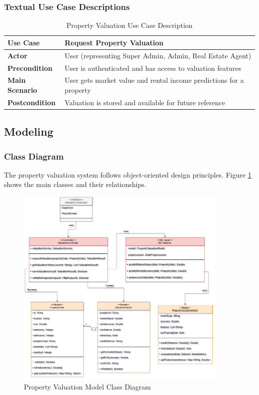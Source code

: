 \subsubsection{Textual Use Case Descriptions}

\begin{table}[htbp]
    \centering
    \begin{tabular}{|p{3cm}|p{10cm}|}
        \hline
        \textbf{Use Case} & \textbf{Request Property Valuation} \\
        \hline
        \textbf{Actor} & User (representing Super Admin, Admin, Real Estate Agent) \\
        \hline
        \textbf{Precondition} & User is authenticated and has access to valuation features \\
        \hline
        \textbf{Main Scenario} & User gets market value and rental income predictions for a property \\
        \hline
        \textbf{Postcondition} & Valuation is stored and available for future reference \\
        \hline
    \end{tabular}
    \caption{Property Valuation Use Case Description}
    \label{tab:property-valuation-use-case}
\end{table}

\subsection{Modeling}
\subsubsection{Class Diagram}
The property valuation system follows object-oriented design principles. Figure \ref{fig:valuation-class-diagram} shows the main classes and their relationships.
\newpage

\begin{figure}[htbp]
    \centering
    \includegraphics[width=0.9\textwidth]{images/valuation_class_diagram.png}
    \caption{Property Valuation Model Class Diagram}
    \label{fig:valuation-class-diagram}
\end{figure}

